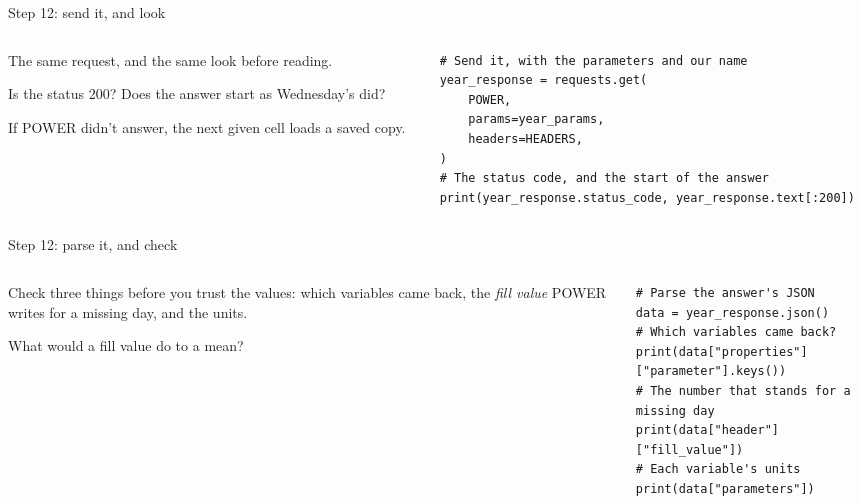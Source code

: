 \documentclass[9pt,aspectratio=169]{beamer}
\begin{document}
\begin{frame}[fragile]{Step 12: send it, and look}
    \begin{columns}[T]
        \begin{column}{0.37\textwidth}
            The same request, and the same look before reading.

            \medskip
            Is the status 200? Does the answer start as Wednesday's did?

            \medskip
            If POWER didn't answer, the next given cell loads a saved copy.
        \end{column}
        \begin{column}{0.6\textwidth}
\begin{lstlisting}
# Send it, with the parameters and our name
year_response = requests.get(
    POWER,
    params=year_params,
    headers=HEADERS,
)
# The status code, and the start of the answer
print(year_response.status_code, year_response.text[:200])
\end{lstlisting}
        \end{column}
    \end{columns}
\end{frame}

\begin{frame}[fragile]{Step 12: parse it, and check}
    \begin{columns}[T]
        \begin{column}{0.37\textwidth}
            Check three things before you trust the values: which variables came back, the \textit{fill value} POWER writes for a missing day, and the units.

            \medskip
            What would a fill value do to a mean?
        \end{column}
        \begin{column}{0.6\textwidth}
\begin{lstlisting}
# Parse the answer's JSON
data = year_response.json()
# Which variables came back?
print(data["properties"]["parameter"].keys())
# The number that stands for a missing day
print(data["header"]["fill_value"])
# Each variable's units
print(data["parameters"])
\end{lstlisting}
        \end{column}
    \end{columns}
\end{frame}
\end{document}
